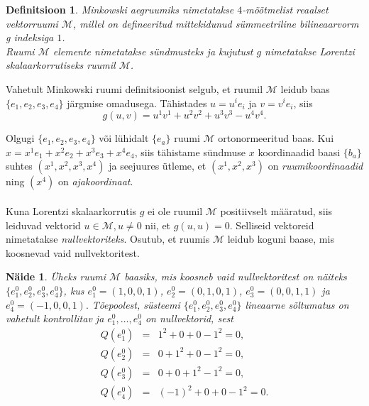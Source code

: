 \documentclass[a4paper,12pt]{article}
\newtheorem{definitsioon}{Definitsioon}[section]
\newtheorem{naide}{Näide}[section]
\numberwithin{equation}{section}
\begin{document}
\begin{definitsioon}
\emph{Minkowski aegruumiks} nimetatakse $4$-mõõtmelist reaalset vektorruumi $\mathcal{M}$, millel on defineeritud mittekidunud sümmeetriline bilineaarvorm g indeksiga $1$. \\
Ruumi $\mathcal{M}$ elemente nimetatakse \emph{sündmusteks} ja kujutust $g$ nimetatakse \emph{Lorentzi skalaarkorrutiseks} ruumil $\mathcal{M}$.
\end{definitsioon}
Vahetult Minkowski ruumi definitsioonist selgub, et ruumil $\mathcal{M}$ leidub baas $\{e_1, e_2, e_3, e_4\}$ järgmise omadusega. Tähistades $u = u^i e_i$ ja $v = v^i e_i$, siis
\[g\left(u, v\right) = u^1 v^1 + u^2 v^2 + u^3 v^3 - u^4 v^4.\]

Olgugi $\{e_1, e_2, e_3, e_4\}$ või lühidalt $\{e_a\}$ ruumi $\mathcal{M}$ ortonormeeritud baas. 
Kui $x = x^1 e_1 + x^2 e_2 + x^3 e_3 + x^4 e_4$, siis tähistame sündmuse $x$ koordinaadid baasi $\{b_a\}$ suhtes $\left( x^1, x^2, x^3, x^4 \right)$ ja seejuures ütleme, et $\left( x^1, x^2, x^3 \right)$ on \emph{ruumikoordinaadid} ning $\left(x^4\right)$ on \emph{ajakoordinaat}.
\paragraph{}
Kuna Lorentzi skalaarkorrutis $g$ ei ole ruumil $\mathcal{M}$ positiivselt määratud, siis leiduvad vektorid $u \in \mathcal{M}, u \neq 0$ nii, et $g \left(u, u\right) = 0$. Selliseid vektoreid nimetatakse \emph{nullvektoriteks}. Osutub, et ruumis $\mathcal{M}$ leidub koguni baase, mis koosnevad vaid nullvektoritest.

\begin{naide}
Üheks ruumi $\mathcal{M}$ baasiks, mis koosneb vaid nullvektoritest on näiteks $\{e_1^0, e_2^0, e_3^0, e_4^0\}$, kus $e_1^0 = \left(1, 0, 0, 1\right)$, $e_2^0 = \left(0, 1, 0, 1\right)$, $e_3^0 = \left(0, 0, 1, 1\right)$ ja $e_4^0 = \left(-1, 0, 0, 1\right).$
Tõepoolest, süsteemi $\{e_1^0, e_2^0, e_3^0, e_4^0\}$ lineaarne sõltumatus on vahetult kontrollitav ja $e_1^0, \dots, e_4^0$ on nullvektorid, sest
\begin{eqnarray*}
Q\left(e_1^0\right) &=& 1^2 + 0 + 0 - 1^2 = 0, \\
Q\left(e_2^0\right) &=& 0 + 1^2 + 0 - 1^2 = 0, \\
Q\left(e_3^0\right) &=& 0 + 0 + 1^2 - 1^2 = 0, \\
Q\left(e_4^0\right) &=& (-1)^2 + 0 + 0 - 1^2 = 0.
\end{eqnarray*}
\end{naide}
\end{document}
